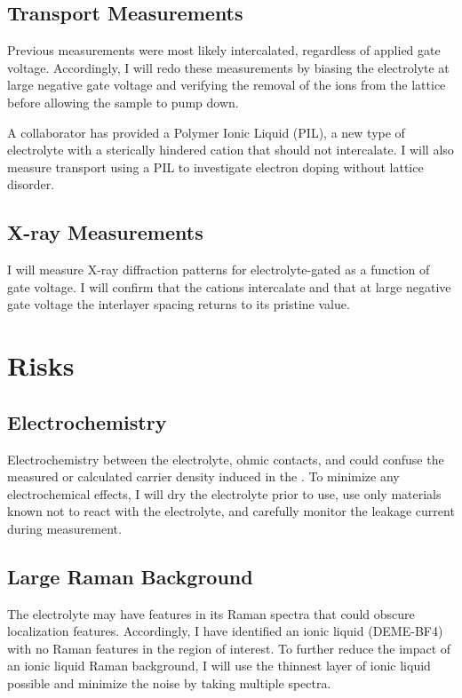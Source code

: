 \documentclass[11pt]{article}
\begin{document}
\subsection{Transport Measurements}

Previous measurements were most likely intercalated, regardless of applied gate voltage. Accordingly, I will redo these measurements by biasing the electrolyte at large negative gate voltage and verifying the removal of the ions from the lattice before allowing the sample to pump down.

A collaborator has provided a Polymer Ionic Liquid (PIL), a new type of electrolyte with a sterically hindered cation that should not intercalate. I will also measure transport using a PIL to investigate electron doping without lattice disorder.

\subsection{X-ray Measurements}

I will measure X-ray diffraction patterns for electrolyte-gated \rucl as a function of gate voltage. I will confirm that the cations intercalate and that at large negative gate voltage the interlayer spacing returns to its pristine value.

\section{Risks}

\subsection{Electrochemistry}

Electrochemistry between the electrolyte, ohmic contacts, and \rucl could confuse the measured or calculated carrier density induced in the \ruclnospace. To minimize any electrochemical effects, I will dry the electrolyte prior to use, use only materials known not to react with the electrolyte, and carefully monitor the leakage current during measurement.

\subsection{Large Raman Background}

The electrolyte may have features in its Raman spectra that could obscure localization features. Accordingly, I have identified an ionic liquid (DEME-BF4) with no Raman features in the region of interest. To further reduce the impact of an ionic liquid Raman background, I will use the thinnest layer of ionic liquid possible and minimize the noise by taking multiple spectra.
\end{document}
